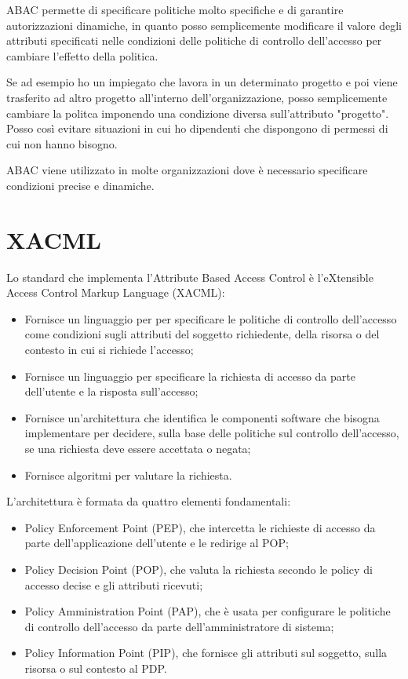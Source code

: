 ABAC permette di specificare politiche molto specifiche e di garantire autorizzazioni dinamiche, in quanto posso semplicemente modificare il valore degli attributi specificati nelle condizioni delle politiche di controllo dell'accesso per cambiare l'effetto della politica.

Se ad esempio ho un impiegato che lavora in un  determinato progetto e poi viene trasferito ad altro progetto all'interno dell'organizzazione, posso semplicemente cambiare la politca imponendo una condizione diversa sull'attributo "progetto". Posso così evitare situazioni in cui ho dipendenti che dispongono di permessi di cui non hanno bisogno. 

ABAC viene utilizzato in molte organizzazioni dove è necessario specificare condizioni precise e dinamiche.

\section{XACML}
Lo standard che implementa l'Attribute Based Access Control è l'eXtensible Access Control Markup Language (XACML):
\begin{itemize}
    \item Fornisce un linguaggio per per specificare le politiche di controllo dell'accesso come condizioni sugli attributi del soggetto richiedente, della risorsa o del contesto in cui si richiede l'accesso;
    \item Fornisce un linguaggio per specificare la richiesta di accesso da parte dell'utente e la risposta sull'accesso;
    \item Fornisce un'architettura che identifica le componenti software che bisogna implementare per decidere, sulla base delle politiche sul controllo dell'accesso, se una richiesta deve essere accettata o negata;
    \item Fornisce algoritmi per valutare la richiesta.
\end{itemize}

\noindent L'architettura è formata da quattro elementi fondamentali:
\begin{itemize}
    \item Policy Enforcement Point (PEP), che intercetta le richieste di accesso da parte dell'applicazione dell'utente e le redirige al POP;
    \item Policy Decision Point (POP), che valuta la richiesta secondo le policy di accesso decise e gli attributi ricevuti;
    \item Policy Amministration Point (PAP), che è usata per configurare le politiche di controllo dell'accesso da parte dell'amministratore di sistema;
    \item Policy Information Point (PIP), che fornisce gli attributi sul soggetto, sulla risorsa o sul contesto al PDP.
\end{itemize}


